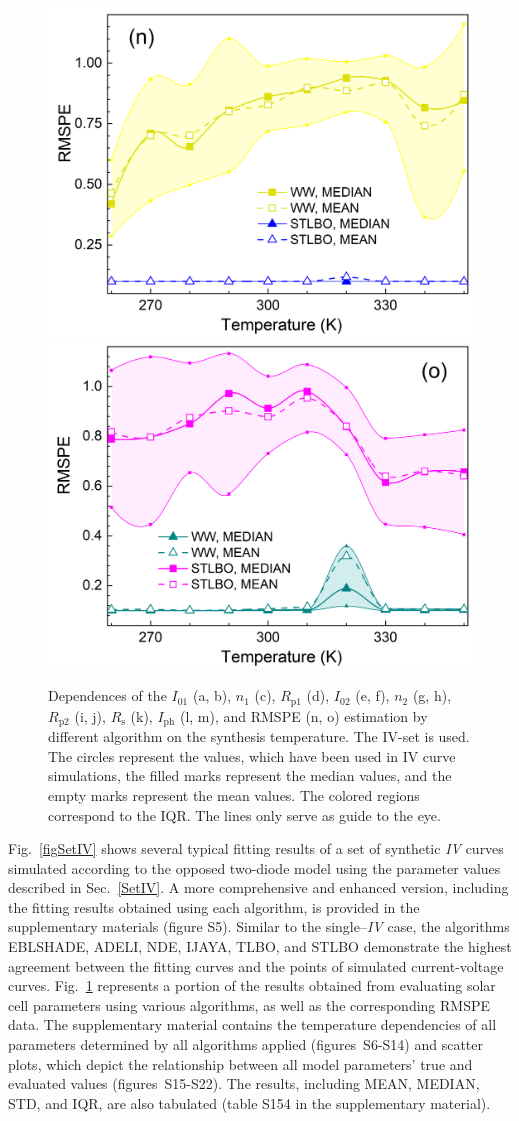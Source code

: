 \documentclass[a4paper,fleqn]{cas-sc}
\begin{document}
\begin{figure}[]
        \includegraphics[width=.32\textwidth]{AfigN}
        \includegraphics[width=.32\textwidth]{AfigO}
	  \caption{Dependences of the $I_{01}$ (a, b), $n_1$ (c), $R_\mathrm{p1}$ (d), $I_{02}$ (e, f),
               $n_2$ (g, h), $R_\mathrm{p2}$ (i, j), $R_\mathrm{s}$ (k), $I_\mathrm{ph}$ (l, m), and RMSPE (n, o)
               estimation by different algorithm on the synthesis temperature.
               The IV-set is used.
               The circles represent the values, which have been used in IV curve simulations,
               the filled marks represent the median values, and the empty marks represent the mean values.
               The colored regions correspond to the IQR.
               The lines only serve as guide to the eye.
               }\label{figTDepIVset}
\end{figure}

Fig.~\ref{figSetIV} shows several typical fitting results of a set of synthetic \emph{IV} curves
simulated according to the opposed two-diode model using the parameter values described in Sec.~\ref{SetIV}.
A more comprehensive and enhanced version, including the fitting results obtained using each algorithm,
is provided in the supplementary materials (figure S5).
Similar to the single--\emph{IV} case, the algorithms EBLSHADE, ADELI, NDE, IJAYA, TLBO, and STLBO
demonstrate the highest agreement between the fitting curves and the points of simulated current-voltage curves.
Fig.~\ref{figTDepIVset} represents a portion of the results obtained from evaluating solar cell parameters using various algorithms,
as well as the corresponding RMSPE data.
The supplementary material contains the temperature dependencies of all
parameters determined by all algorithms applied (figures~S6-S14) and scatter plots,
which depict the relationship between all model parameters' true and evaluated values (figures~S15-S22).
The results, including MEAN, MEDIAN, STD, and IQR, are also tabulated (table S154 in the supplementary material).
\end{document}
